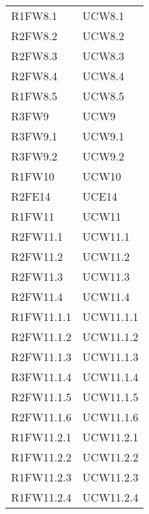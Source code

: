 \begin{table}[H]
\begin{tabular}[t]{ m{}<{\centering}  m{}<{\centering} }
	R1FW8.1 & UCW8.1\\	

	R2FW8.2 & UCW8.2\\	 
	 
	R2FW8.3 & UCW8.3\\	
	 
	R2FW8.4 & UCW8.4\\	 
	 
	R1FW8.5 & UCW8.5\\	 
	 
	R3FW9 & UCW9\\	
	 
	R3FW9.1 & UCW9.1\\	 
	 
	R3FW9.2 & UCW9.2\\	  
	 
	R1FW10 & UCW10 \\	 
	 
	R2FE14 & UCE14\\	 
	 	 
	R1FW11 & UCW11\\	 	
	
	R2FW11.1 & UCW11.1 \\
 	
 	R2FW11.2 & UCW11.2 \\
 	
	R2FW11.3 & UCW11.3 \\
 
	R2FW11.4 & UCW11.4 \\
	
	R1FW11.1.1 & UCW11.1.1 \\
		
	R2FW11.1.2 & UCW11.1.2 \\
		
	R2FW11.1.3 & UCW11.1.3 \\
	
	R3FW11.1.4 & UCW11.1.4 \\
	
	R2FW11.1.5 & UCW11.1.5 \\
	
	R2FW11.1.6 & UCW11.1.6 \\
	
	R1FW11.2.1 & UCW11.2.1 \\
	
	R1FW11.2.2 & UCW11.2.2 \\	
	
	R1FW11.2.3 & UCW11.2.3 \\
	
	R1FW11.2.4 & UCW11.2.4 \\
	

\end{tabular}
\end{table}
